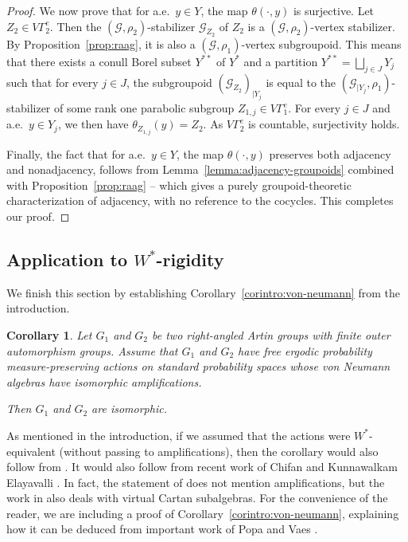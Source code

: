 \documentclass[11pt]{article}
\numberwithin{equation}{section}
\let\mathcal\mathscr
\theoremstyle{plain}
\newtheorem{cor}[theo]{Corollary}
\theoremstyle{definition}
\let\Dunion\bigsqcup
\newcommand{\calg}{\mathcal{G}}
\begin{document}
\begin{proof}
We now prove that for a.e.\ $y\in Y$, the map $\theta(\cdot,y)$ is surjective. Let $Z_2\in V\Gamma^e_2$. Then the $(\calg,\rho_2)$-stabilizer $\calg_{Z_2}$ of $Z_2$ is a $(\calg,\rho_2)$-vertex stabilizer. By Proposition~\ref{prop:raag}, it is also a $(\calg,\rho_1)$-vertex subgroupoid. This means that there exists a conull Borel subset $Y^{**}$ of $Y^*$ and a partition $Y^{**}=\Dunion_{j\in J} Y_j$ such that for every $j\in J$, the subgroupoid $(\calg_{Z_2})_{|Y_j}$ is equal to the $(\calg_{|Y_j},\rho_1)$-stabilizer of some rank one parabolic subgroup $Z_{1,j}\in V\Gamma_1^e$. For every $j\in J$ and a.e.\ $y\in Y_j$, we then have $\theta_{Z_{1,j}}(y)=Z_2$. As $V\Gamma_2^e$ is countable, surjectivity holds.

Finally, the fact that for a.e.\ $y\in Y$, the map $\theta(\cdot,y)$ preserves both adjacency and nonadjacency, follows from Lemma~\ref{lemma:adjacency-groupoids} combined with Proposition~\ref{prop:raag} -- which gives a purely groupoid-theoretic characterization of adjacency, with no reference to the cocycles. This completes our proof.
\end{proof}

\subsection{Application to $W^*$-rigidity}\label{sec:von-neumann}

We finish this section by establishing Corollary~\ref{corintro:von-neumann} from the introduction.

\begin{cor}
\label{cor:von-neumann}
Let $G_1$ and $G_2$ be two right-angled Artin groups with finite outer automorphism groups. Assume that $G_1$ and $G_2$ have free ergodic probability measure-preserving actions on standard probability spaces whose von Neumann algebras have isomorphic amplifications.

Then $G_1$ and $G_2$ are isomorphic.
\end{cor}

As mentioned in the introduction, if we assumed that the actions were $W^*$\nobreakdash-equi\-valent (without passing to amplifications), then the corollary would also follow from \cite[Cor.\,4.2]{HHL}. It would also follow from recent work of Chifan and Kunnawalkam Elayavalli \cite[Th.\,1.3]{CE}. In fact, the statement of \cite[Th.\,1.3]{CE} does not mention amplifications, but the work in \cite[Th.\,3.1]{CE} also deals with virtual Cartan subalgebras. For the convenience of the reader, we are including a proof of Corollary~\ref{corintro:von-neumann}, explaining how it can be deduced from important work of Popa and Vaes \cite{PV1}.
\end{document}

